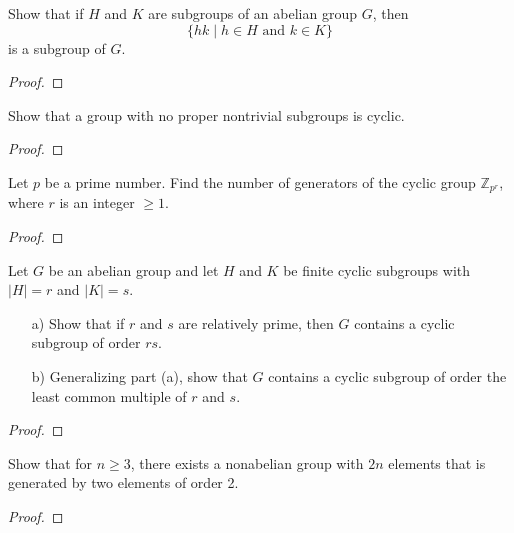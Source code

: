 \begin{theorem}[Exercise 4]\label{Ex4}
  \leanok
    Show that if $H$ and $K$ are subgroups of an abelian group $G$, then
    \[
    \{hk \mid h \in H \text{ and } k \in K\}
    \]
    is a subgroup of $G$.
\end{theorem}
\begin{proof}
  \leanok
\end{proof}

\begin{theorem}[Exercise 5]\label{Ex5}
  \leanok
Show that a group with no proper nontrivial subgroups is cyclic.

\end{theorem}
\begin{proof}
  \leanok
\end{proof}

\begin{theorem}[Exercise 6]\label{Ex6}
  \leanok
   Let $p$ be a prime number. Find the number of generators of the cyclic group $\mathbb{Z}_{p^r}$, where $r$ is an integer $\geq 1$.
\end{theorem}
\begin{proof}
  \leanok
\end{proof}

\begin{theorem}[Exercise 7]\label{Ex7}
    Let $G$ be an abelian group and let $H$ and $K$ be finite cyclic subgroups with $|H| = r$ and $|K| = s$.
    \begin{enumerate}
        \item[a)] Show that if $r$ and $s$ are relatively prime, then $G$ contains a cyclic subgroup of order $rs$.

        \item[b)] Generalizing part (a), show that $G$ contains a cyclic subgroup of order the least common multiple of $r$ and $s$.
    \end{enumerate}
\end{theorem}
\begin{proof}

\end{proof}

\begin{theorem}[Exercise 8]\label{Ex8}
    Show that for $n \geq 3$, there exists a nonabelian group with $2n$ elements that is generated by two elements of order 2.
\end{theorem}
\begin{proof}

\end{proof}


